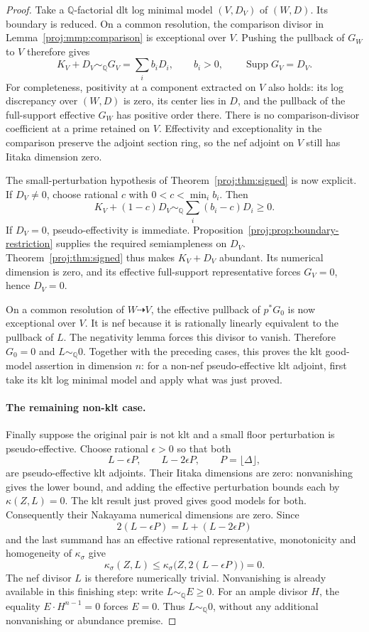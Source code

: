 \documentclass[11pt,letterpaper]{article}
\theoremstyle{definition}
\theoremstyle{remark}
\begin{document}
\begin{proof}
Take a \(\mathbb{Q}\)-factorial dlt log minimal model
\((V,D_V)\) of \((W,D)\).
Its boundary is reduced. On a common resolution, the comparison
divisor in Lemma~\ref{proj:mmp:comparison} is exceptional over \(V\).
Pushing the pullback of \(G_W\) to \(V\) therefore gives
\[
 K_V+D_V\sim_{\mathbb{Q}}G_V=\sum_i b_iD_i,\qquad b_i>0,
 \qquad \operatorname{Supp} G_V=D_V.
\]
For completeness, positivity at a component extracted on \(V\)
also holds: its log discrepancy over \((W,D)\) is zero, its
center lies in \(D\), and the pullback of the full-support
effective \(G_W\) has positive order there.
There is no comparison-divisor coefficient at a prime retained
on \(V\).
Effectivity and exceptionality in the comparison preserve the
adjoint section ring, so the nef adjoint on \(V\) still has
Iitaka dimension zero.

The small-perturbation hypothesis of
Theorem~\ref{proj:thm:signed} is now explicit.
If \(D_V\neq 0\), choose rational \(c\) with
\(0<c<\min_i b_i\). Then
\[
 K_V+(1-c)D_V
 \sim_{\mathbb{Q}}\sum_i(b_i-c)D_i\geq 0.
\]
If \(D_V=0\), pseudo-effectivity is immediate.
Proposition~\ref{proj:prop:boundary-restriction} supplies the
required semiampleness on \(D_V\).
Theorem~\ref{proj:thm:signed} thus makes \(K_V+D_V\) abundant.
Its numerical dimension is zero, and its effective
full-support representative forces \(G_V=0\), hence \(D_V=0\).

On a common resolution of \(W\dashrightarrow V\), the effective
pullback of \(p^*G_0\) is now exceptional over \(V\).
It is nef because it is rationally linearly equivalent to the
pullback of \(L\). The negativity lemma forces this divisor
to vanish. Therefore \(G_0=0\) and \(L\sim_{\mathbb{Q}}0\).
Together with the preceding cases, this proves the klt
good-model assertion in dimension \(n\): for a non-nef
pseudo-effective klt adjoint, first take its klt log minimal
model and apply what was just proved.

\paragraph{The remaining non-klt case.}
Finally suppose the original pair is not klt and a small
floor perturbation is pseudo-effective. Choose rational
\(\epsilon>0\) so that both
\[
 L-\epsilon P,\qquad L-2\epsilon P,
 \qquad P=\lfloor\Delta\rfloor,
\]
are pseudo-effective klt adjoints.
Their Iitaka dimensions are zero: nonvanishing gives the lower
bound, and adding the effective perturbation bounds each by
\(\kappa(Z,L)=0\).
The klt result just proved gives good models for both.
Consequently their Nakayama numerical dimensions are zero.
Since
\[
 2(L-\epsilon P)
   =L+(L-2\epsilon P)
\]
and the last summand has an effective rational representative,
monotonicity and homogeneity of \(\kappa_\sigma\) give
\[
 \kappa_\sigma(Z,L)
 \leq\kappa_\sigma\bigl(Z,2(L-\epsilon P)\bigr)=0.
\]
The nef divisor \(L\) is therefore numerically trivial.
Nonvanishing is already available in this finishing step:
write \(L\sim_{\mathbb{Q}}E\geq 0\).
For an ample divisor \(H\), the equality
\(E\cdot H^{n-1}=0\) forces \(E=0\).
Thus \(L\sim_{\mathbb{Q}}0\), without any additional nonvanishing or
abundance premise.


\end{proof}
\end{document}
